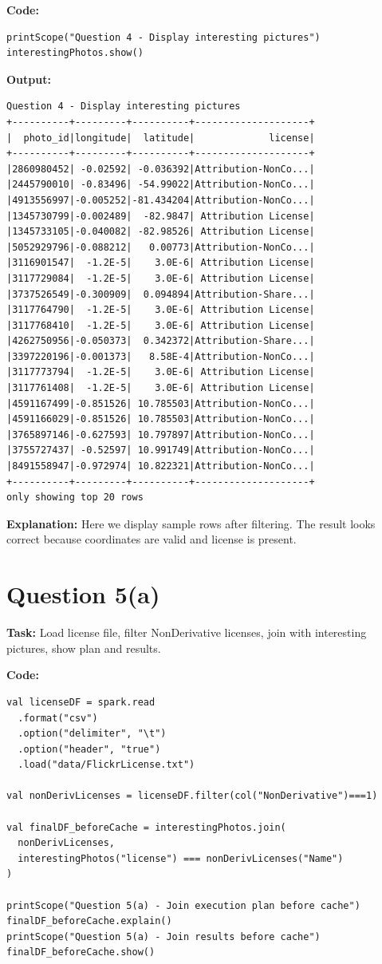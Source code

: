 \documentclass[11pt]{article}
\begin{document}
\textbf{Code:}
\begin{lstlisting}
printScope("Question 4 - Display interesting pictures")
interestingPhotos.show()
\end{lstlisting}

\textbf{Output:}
\begin{lstlisting}
Question 4 - Display interesting pictures
+----------+---------+----------+--------------------+
|  photo_id|longitude|  latitude|             license|
+----------+---------+----------+--------------------+
|2860980452| -0.02592| -0.036392|Attribution-NonCo...|
|2445790010| -0.83496| -54.99022|Attribution-NonCo...|
|4913556997|-0.005252|-81.434204|Attribution-NonCo...|
|1345730799|-0.002489|  -82.9847| Attribution License|
|1345733105|-0.040082| -82.98526| Attribution License|
|5052929796|-0.088212|   0.00773|Attribution-NonCo...|
|3116901547|  -1.2E-5|    3.0E-6| Attribution License|
|3117729084|  -1.2E-5|    3.0E-6| Attribution License|
|3737526549|-0.300909|  0.094894|Attribution-Share...|
|3117764790|  -1.2E-5|    3.0E-6| Attribution License|
|3117768410|  -1.2E-5|    3.0E-6| Attribution License|
|4262750956|-0.050373|  0.342372|Attribution-Share...|
|3397220196|-0.001373|   8.58E-4|Attribution-NonCo...|
|3117773794|  -1.2E-5|    3.0E-6| Attribution License|
|3117761408|  -1.2E-5|    3.0E-6| Attribution License|
|4591167499|-0.851526| 10.785503|Attribution-NonCo...|
|4591166029|-0.851526| 10.785503|Attribution-NonCo...|
|3765897146|-0.627593| 10.797897|Attribution-NonCo...|
|3755727437| -0.52597| 10.991749|Attribution-NonCo...|
|8491558947|-0.972974| 10.822321|Attribution-NonCo...|
+----------+---------+----------+--------------------+
only showing top 20 rows
\end{lstlisting}

\textbf{Explanation:} Here we display sample rows after filtering. The result looks correct because coordinates are valid and license is present.

\section*{Question 5(a)}
\textbf{Task:} Load license file, filter NonDerivative licenses, join with interesting pictures, show plan and results.

\textbf{Code:}
\begin{lstlisting}
val licenseDF = spark.read
  .format("csv")
  .option("delimiter", "\t")
  .option("header", "true")
  .load("data/FlickrLicense.txt")

val nonDerivLicenses = licenseDF.filter(col("NonDerivative")===1)

val finalDF_beforeCache = interestingPhotos.join(
  nonDerivLicenses,
  interestingPhotos("license") === nonDerivLicenses("Name")
)

printScope("Question 5(a) - Join execution plan before cache")
finalDF_beforeCache.explain()
printScope("Question 5(a) - Join results before cache")
finalDF_beforeCache.show()
\end{lstlisting}
\end{document}

